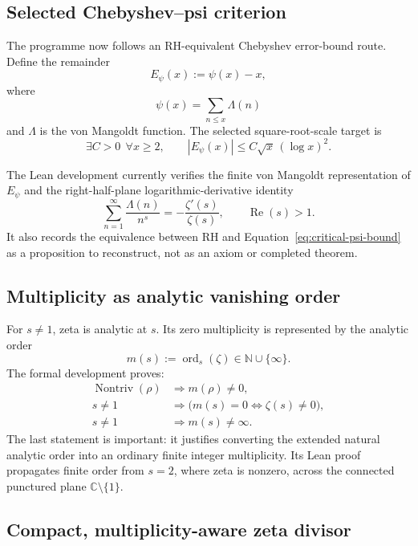 \documentclass[11pt,a4paper]{article}
\newcommand{\RePart}{\operatorname{Re}}
\begin{document}
\subsection{Selected Chebyshev--psi criterion}

The programme now follows an RH-equivalent Chebyshev error-bound route. Define
the remainder
\[
  E_{\psi}(x):=\psi(x)-x,
\]
where
\[
  \psi(x)=\sum_{n\leq x}\Lambda(n)
\]
and $\Lambda$ is the von Mangoldt function. The selected square-root-scale
target is
\begin{equation}
  \exists C>0\ \ \forall x\geq 2,\qquad
  |E_{\psi}(x)|
  \leq C\sqrt{x}\,(\log x)^2.
  \label{eq:critical-psi-bound}
\end{equation}

The Lean development currently verifies the finite von Mangoldt representation
of $E_{\psi}$ and the right-half-plane logarithmic-derivative identity
\begin{equation}
  \sum_{n=1}^{\infty}\frac{\Lambda(n)}{n^s}
  =-\frac{\zeta'(s)}{\zeta(s)},
  \qquad \RePart(s)>1.
  \label{eq:von-mangoldt-log-derivative}
\end{equation}
It also records the equivalence between RH and
Equation~\eqref{eq:critical-psi-bound} as a proposition to reconstruct, not as
an axiom or completed theorem.

\subsection{Multiplicity as analytic vanishing order}

For $s\neq 1$, zeta is analytic at $s$. Its zero multiplicity is represented by
the analytic order
\[
  m(s):=\operatorname{ord}_{s}(\zeta)\in\mathbb N\cup\{\infty\}.
\]
The formal development proves:
\begin{align*}
  \operatorname{Nontriv}(\rho)
    &\Longrightarrow m(\rho)\neq 0,\\
  s\neq 1
    &\Longrightarrow
      \bigl(m(s)=0\Longleftrightarrow\zeta(s)\neq 0\bigr),\\
  s\neq 1
    &\Longrightarrow m(s)\neq\infty.
\end{align*}
The last statement is important: it justifies converting the extended natural
analytic order into an ordinary finite integer multiplicity. Its Lean proof
propagates finite order from $s=2$, where zeta is nonzero, across the connected
punctured plane $\mathbb C\setminus\{1\}$.

\subsection{Compact, multiplicity-aware zeta divisor}
\end{document}
